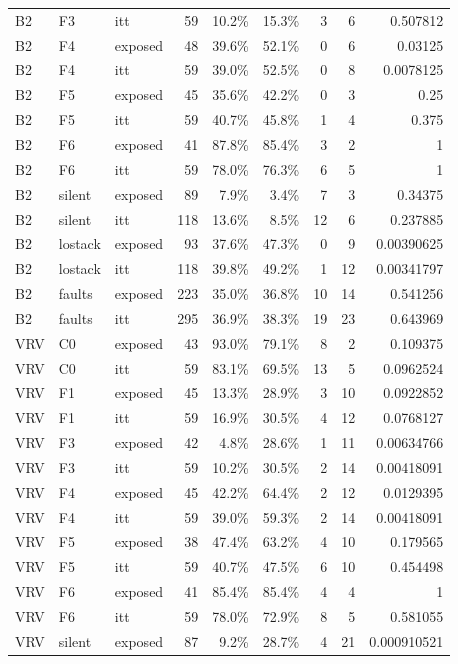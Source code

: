 \begin{tabular}{lllrrrrrr}
B2 & F3 & itt & 59 & 10.2\% & 15.3\% & 3 & 6 & 0.507812 \\
B2 & F4 & exposed & 48 & 39.6\% & 52.1\% & 0 & 6 & 0.03125 \\
B2 & F4 & itt & 59 & 39.0\% & 52.5\% & 0 & 8 & 0.0078125 \\
B2 & F5 & exposed & 45 & 35.6\% & 42.2\% & 0 & 3 & 0.25 \\
B2 & F5 & itt & 59 & 40.7\% & 45.8\% & 1 & 4 & 0.375 \\
B2 & F6 & exposed & 41 & 87.8\% & 85.4\% & 3 & 2 & 1 \\
B2 & F6 & itt & 59 & 78.0\% & 76.3\% & 6 & 5 & 1 \\
B2 & silent & exposed & 89 & 7.9\% & 3.4\% & 7 & 3 & 0.34375 \\
B2 & silent & itt & 118 & 13.6\% & 8.5\% & 12 & 6 & 0.237885 \\
B2 & lostack & exposed & 93 & 37.6\% & 47.3\% & 0 & 9 & 0.00390625 \\
B2 & lostack & itt & 118 & 39.8\% & 49.2\% & 1 & 12 & 0.00341797 \\
B2 & faults & exposed & 223 & 35.0\% & 36.8\% & 10 & 14 & 0.541256 \\
B2 & faults & itt & 295 & 36.9\% & 38.3\% & 19 & 23 & 0.643969 \\
VRV & C0 & exposed & 43 & 93.0\% & 79.1\% & 8 & 2 & 0.109375 \\
VRV & C0 & itt & 59 & 83.1\% & 69.5\% & 13 & 5 & 0.0962524 \\
VRV & F1 & exposed & 45 & 13.3\% & 28.9\% & 3 & 10 & 0.0922852 \\
VRV & F1 & itt & 59 & 16.9\% & 30.5\% & 4 & 12 & 0.0768127 \\
VRV & F3 & exposed & 42 & 4.8\% & 28.6\% & 1 & 11 & 0.00634766 \\
VRV & F3 & itt & 59 & 10.2\% & 30.5\% & 2 & 14 & 0.00418091 \\
VRV & F4 & exposed & 45 & 42.2\% & 64.4\% & 2 & 12 & 0.0129395 \\
VRV & F4 & itt & 59 & 39.0\% & 59.3\% & 2 & 14 & 0.00418091 \\
VRV & F5 & exposed & 38 & 47.4\% & 63.2\% & 4 & 10 & 0.179565 \\
VRV & F5 & itt & 59 & 40.7\% & 47.5\% & 6 & 10 & 0.454498 \\
VRV & F6 & exposed & 41 & 85.4\% & 85.4\% & 4 & 4 & 1 \\
VRV & F6 & itt & 59 & 78.0\% & 72.9\% & 8 & 5 & 0.581055 \\
VRV & silent & exposed & 87 & 9.2\% & 28.7\% & 4 & 21 & 0.000910521 \\

\end{tabular}
